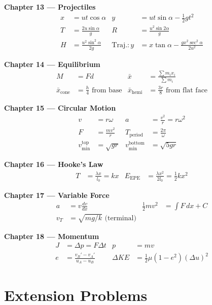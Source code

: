 \documentclass[12pt, a4paper]{book}
\begin{document}
\begin{summarybox}

\textbf{Chapter 13 --- Projectiles}
\begin{align*}
  x &= ut\cos\alpha & y &= ut\sin\alpha - \tfrac{1}{2}gt^2 \\
  T &= \tfrac{2u\sin\alpha}{g} & R &= \tfrac{u^2\sin 2\alpha}{g} \\
  H &= \tfrac{u^2\sin^2\alpha}{2g} & \text{Traj.}: y &= x\tan\alpha - \tfrac{gx^2\sec^2\alpha}{2u^2}
\end{align*}

\textbf{Chapter 14 --- Equilibrium}
\begin{align*}
  M &= Fd & \bar{x} &= \tfrac{\sum m_ix_i}{\sum m_i} \\
  \bar{x}_{\text{cone}} &= \tfrac{h}{4} \text{ from base} & \bar{x}_{\text{hemi}} &= \tfrac{3r}{8} \text{ from flat face}
\end{align*}

\textbf{Chapter 15 --- Circular Motion}
\begin{align*}
  v &= r\omega & a &= \tfrac{v^2}{r} = r\omega^2 \\
  F &= \tfrac{mv^2}{r} & T_{\text{period}} &= \tfrac{2\pi}{\omega} \\
  v_{\min}^{\text{top}} &= \sqrt{gr} & v_{\min}^{\text{bottom}} &= \sqrt{5gr}
\end{align*}

\textbf{Chapter 16 --- Hooke's Law}
\begin{align*}
  T &= \tfrac{\lambda x}{l_0} = kx & E_{\text{EPE}} &= \tfrac{\lambda x^2}{2l_0} = \tfrac{1}{2}kx^2
\end{align*}

\textbf{Chapter 17 --- Variable Force}
\begin{align*}
  a &= v\tfrac{dv}{dx} & \tfrac{1}{2}mv^2 &= \int F\,dx + C \\
  v_T &= \sqrt{mg/k} \text{ (terminal)} & &
\end{align*}

\textbf{Chapter 18 --- Momentum}
\begin{align*}
  J &= \Delta p = F\Delta t & p &= mv \\
  e &= \tfrac{v_B'-v_A'}{u_A-u_B} & \Delta KE &= \tfrac{1}{2}\mu(1-e^2)(\Delta u)^2
\end{align*}

\end{summarybox}

\chapter*{Extension Problems}
\end{document}
